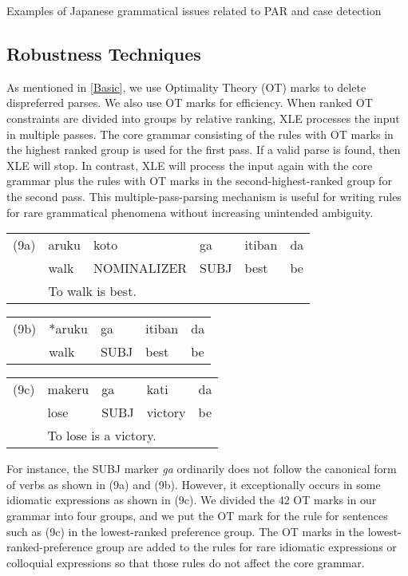 \documentclass[english]{jnlp_1.4_rep}
\begin{document}
\begin{table}[t]
\caption{Examples of Japanese grammatical issues related to PAR and case detection}
\label{table_figure3}

\end{table}


\subsection{Robustness Techniques}

As mentioned in \ref{Basic}, we use Optimality Theory (OT) marks to
delete dispreferred parses.  We also use OT marks for efficiency.
When ranked OT constraints are divided into groups by relative
ranking, XLE processes the input in multiple passes.  The core grammar
consisting of the rules with OT marks in the highest ranked group is
used for the first pass.  If a valid parse is found, then XLE will
stop.  In contrast, XLE will process the input again with the core
grammar plus the rules with OT marks in the second-highest-ranked
group for the second pass.  This multiple-pass-parsing mechanism is
useful for writing rules for rare grammatical phenomena without
increasing unintended ambiguity.

\vspace{2pt}
\noindent
\begin{tabular}{ll@{ }l@{ }l@{ }l@{ }l}
(9a) & aruku&koto&ga&itiban&da\\
     & walk&NOMINALIZER&SUBJ&best&be\\
     & \multicolumn{5}{l}{\quad To walk is best.}
\end{tabular}

\noindent
\begin{tabular}{ll@{ }l@{ }l@{ }l}
(9b) & $*$aruku&ga&itiban&da\\
     & walk&SUBJ&best&be
\end{tabular}

\noindent
\begin{tabular}{ll@{ }l@{ }l@{ }l}
(9c) & makeru&ga&kati&da\\
     & lose&SUBJ&victory&be\\
     & \multicolumn{4}{l}{\quad To lose is a victory.}
\end{tabular}
         
For instance, the SUBJ marker \textit{ga} ordinarily does not follow
the canonical form of verbs as shown in (9a) and (9b).  However, it
exceptionally occurs in some idiomatic expressions as shown in (9c).
We divided the 42 OT marks in our grammar into four groups, and we put
the OT mark for the rule for sentences such as (9c) in the
lowest-ranked preference group.  The OT marks in the
lowest-ranked-preference group are added to the rules for rare
idiomatic expressions or colloquial expressions so that those rules do
not affect the core grammar.
\end{document}
